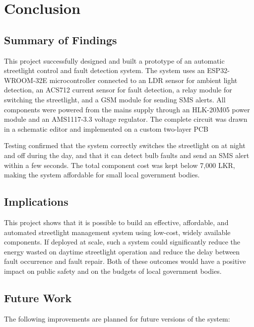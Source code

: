 \documentclass{article}
\begin{document}
\section{Conclusion}

\subsection{Summary of Findings}

This project successfully designed and built a prototype of an automatic streetlight control and fault detection system. 
The system uses an ESP32-WROOM-32E microcontroller connected to an LDR sensor for ambient light detection, an ACS712 current sensor for fault detection, a relay module for switching the streetlight, 
and a GSM module for sending SMS alerts.
All components were powered from the mains supply through an HLK-20M05 power module and an AMS1117-3.3 voltage regulator. 
The complete circuit was drawn in a schematic editor and implemented on a custom two-layer PCB

Testing confirmed that the system correctly switches the streetlight on at night and off during the day, and that it can detect bulb faults and send an SMS alert within a few seconds. The total component cost was kept below 7,000 LKR, 
making the system affordable for small local government bodies.

\subsection{Implications}

This project shows that it is possible to build an effective, affordable, and automated streetlight management system using low-cost, widely available components.
If deployed at scale, such a system could significantly reduce the energy wasted on daytime streetlight operation and reduce the delay between fault occurrence and fault repair. 
Both of these outcomes would have a positive impact on public safety and on the budgets of local government bodies.

\subsection{Future Work}

The following improvements are planned for future versions of the system:
\end{document}
